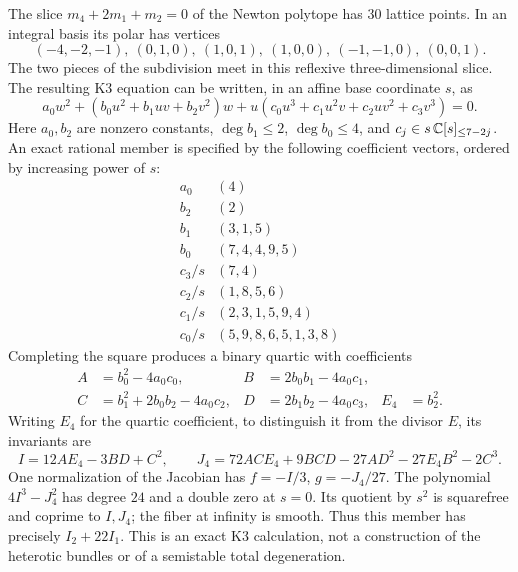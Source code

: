 The slice $m_4+2m_1+m_2=0$ of the Newton polytope has $30$
lattice points. In an integral basis its polar has vertices
\begin{equation}
 (-4,-2,-1),\ (0,1,0),\ (1,0,1),\ (1,0,0),\
 (-1,-1,0),\ (0,0,1).
\end{equation}
The two pieces of the subdivision meet in this reflexive
three-dimensional slice. The resulting K3 equation can be
written, in an affine base coordinate $s$, as
\begin{equation}
 a_0w^2+(b_0u^2+b_1uv+b_2v^2)w
 +u(c_0u^3+c_1u^2v+c_2uv^2+c_3v^3)=0.
\label{eq:x9-k3-slice-equation}
\end{equation}
Here $a_0,b_2$ are nonzero constants,
$\deg b_1\leq2$, $\deg b_0\leq4$, and
$c_j\in s\,\mathbb C[s]_{\leq7-2j}$. An exact rational member
is specified by the following coefficient vectors, ordered
by increasing power of $s$:
\begin{equation}
\begin{array}{c|l}
 a_0&(4)\\ b_2&(2)\\ b_1&(3,1,5)\\ b_0&(7,4,4,9,5)\\
 c_3/s&(7,4)\\ c_2/s&(1,8,5,6)\\
 c_1/s&(2,3,1,5,9,4)\\ c_0/s&(5,9,8,6,5,1,3,8)
\end{array}
\label{eq:x9-k3-coefficients}
\end{equation}
Completing the square produces a binary quartic with coefficients
\begin{equation}
\begin{aligned}
 A&=b_0^2-4a_0c_0,& B&=2b_0b_1-4a_0c_1,\\
 C&=b_1^2+2b_0b_2-4a_0c_2,&D&=2b_1b_2-4a_0c_3,&E_4&=b_2^2.
\end{aligned}
\end{equation}
Writing $E_4$ for the quartic coefficient, to distinguish it
from the divisor $E$, its invariants are
\begin{equation}
 I=12AE_4-3BD+C^2,\qquad
 J_4=72ACE_4+9BCD-27AD^2-27E_4B^2-2C^3.
\end{equation}
One normalization of the Jacobian has $f=-I/3$, $g=-J_4/27$.
The polynomial $4I^3-J_4^2$ has degree $24$ and a double
zero at $s=0$. Its quotient by $s^2$ is squarefree and coprime
to $I,J_4$; the fiber at infinity is smooth. Thus this member
has precisely $I_2+22I_1$. This is an exact K3 calculation,
not a construction of the heterotic bundles or of a semistable
total degeneration.

